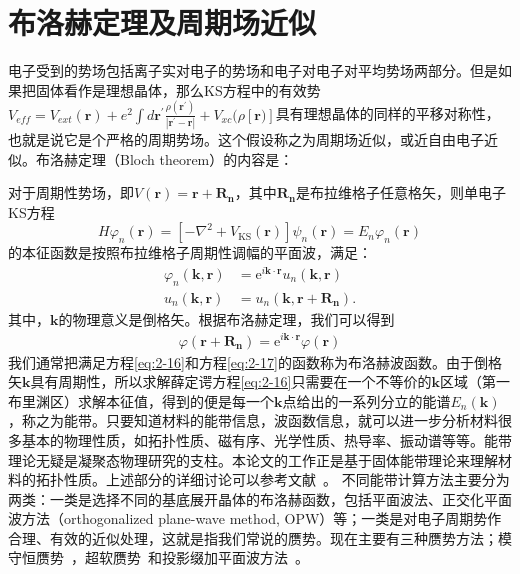 \section{布洛赫定理及周期场近似}
电子受到的势场包括离子实对电子的势场和电子对电子对平均势场两部分。但是如果把固体看作是理想晶体，那么KS方程中的有效势$V_{eff}=V_{ext}(\mathbf{r})+e^{2} \int d \mathbf{r}^{\prime} \frac{\rho\left(\mathbf{r}^{\prime}\right)}{\left|\mathbf{r}^{\prime}-\mathbf{r}\right|}+V_{xc}(\rho[\mathbf{r})]$具有理想晶体的同样的平移对称性，也就是说它是个严格的周期势场。这个假设称之为周期场近似，或近自由电子近似。布洛赫定理（Bloch theorem）的内容是：

对于周期性势场，即$V(\mathbf{r})=\mathbf{r+R_n}$，其中$\mathbf{R_n}$是布拉维格子任意格矢，则单电子KS方程
\begin{equation}
    \label{eq:2-16}
    H \varphi_{n}(\boldsymbol{r})=\left[-\nabla^{2}+V_{\mathrm{KS}}(\boldsymbol{r})\right] \psi_{n}(\boldsymbol{r})=E_{n} \varphi_{n}(\boldsymbol{r})
\end{equation}
的本征函数是按照布拉维格子周期性调幅的平面波，满足：
\begin{equation}
    \label{eq:2-17}
    \begin{aligned}
    \varphi_{n}(\mathbf{k}, \mathbf{r})&=\mathrm{e}^{i \mathbf{k} \cdot \mathbf{r}} u_{n}(\mathbf{k}, \mathbf{r})\\
    u_{n}(\mathbf{k}, \mathbf{r})&=u_{n}\left(\mathbf{k}, \mathbf{r+R_{n}}\right).
    \end{aligned}
\end{equation}
其中，$\mathbf{k}$的物理意义是倒格矢。根据布洛赫定理，我们可以得到
\begin{equation}
    \label{eq:2-18}
    \begin{aligned}
    \varphi(\mathbf{r+R_{n}})=\mathrm{e}^{i \mathbf{k} \cdot \mathbf{r}} \varphi(\mathbf{r})
    \end{aligned}
\end{equation}
我们通常把满足方程\ref{eq:2-16}和方程\ref{eq:2-17}的函数称为布洛赫波函数。由于倒格矢$\mathbf{k}$具有周期性，所以求解薛定谔方程\ref{eq:2-16}只需要在一个不等价的$\mathbf{k}$区域（第一布里渊区）求解本征值，得到的便是每一个$\mathbf{k}$点给出的一系列分立的能谱$E_n(\mathbf{k})$，称之为能带。只要知道材料的能带信息，波函数信息，就可以进一步分析材料很多基本的物理性质，如拓扑性质、磁有序、光学性质、热导率、振动谱等等。能带理论无疑是凝聚态物理研究的支柱。本论文的工作正是基于固体能带理论来理解材料的拓扑性质。上述部分的详细讨论可以参考文献~\cite{solid,solid2,solid3}。
不同能带计算方法主要分为两类：一类是选择不同的基底展开晶体的布洛赫函数，包括平面波法、正交化平面波方法（orthogonalized plane-wave method, OPW）等；一类是对电子周期势作合理、有效的近似处理，这就是指我们常说的赝势。现在主要有三种赝势方法；模守恒赝势~\citep{Hamann1979,Hamann1989}，超软赝势~\citep{soft90}和投影缀加平面波方法~\citep{paw1,paw2}。

